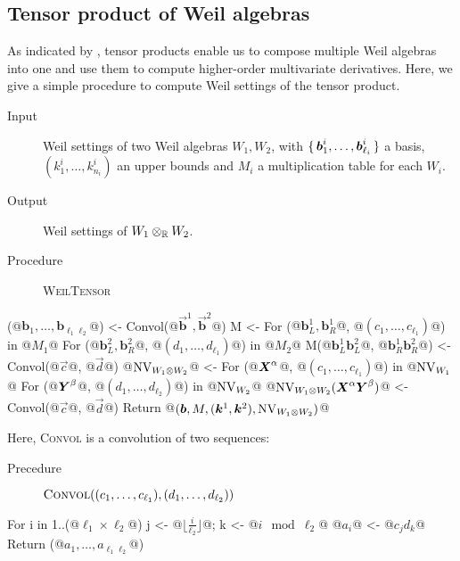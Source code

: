 \documentclass[runningheads]{llncs}
\begin{document}
\subsection{Tensor product of Weil algebras}
\label{sec:tensor-algorithm}
As indicated by , tensor products enable us to compose multiple Weil algebras into one and use them to compute higher-order multivariate derivatives.
Here, we give a simple procedure to compute Weil settings of the tensor product.

\begin{algorithm}[WeilTensor]\label{alg:weil-tensor}
\hfill\vspace{-.25em}
\begin{description}
  \item[Input] Weil settings of two Weil algebras $W_1, W_2$,
  with $\set{\boldsymbol{b}_1^i, \dots, \boldsymbol{b}_{\ell_i}^i}$ a basis,
  $(k^i_1, \dots, k^i_{n_i})$ an upper bounds and $M_i$ a multiplication table for each $W_i$.
  \item[Output] Weil settings of $W_1 \otimes_{\mathbb{R}} W_2$.
  \item[Procedure] {\upshape \textsc{WeilTensor}}
\end{description}
\begin{alg}
(@$\boldsymbol{b}_1, \dots, \boldsymbol{b}_{\ell_1 \ell_2}$@) <- Convol(@$\vec{\boldsymbol{b}}^1, \vec{\boldsymbol{b}}^2$@)
M <- {}
For ({@$\boldsymbol{b}^1_L, \boldsymbol{b}^1_R$@}, @$(c_1,\dots,c_{\ell_1})$@) in @$M_1$@
  For ({@$\boldsymbol{b}^2_L, \boldsymbol{b}^2_R$@}, @$(d_1,\dots,d_{\ell_1})$@) in @$M_2$@
    M({@$\boldsymbol{b}^1_L \boldsymbol{b}^2_L$@, @$\boldsymbol{b}^1_R \boldsymbol{b}^2_R$@}) <- Convol(@$\vec{c}$@, @$\vec{d}$@)
@$\operatorname{NV}_{W_1 \otimes W_2}$@ <- {}
For (@$\boldsymbol{X}^\alpha$@, @$(c_1, \dots, c_{\ell_1})$@) in @$\operatorname{NV}_{W_1}$@
  For (@$\boldsymbol{Y}^\beta$@, @$(d_1,\dots,d_{\ell_2})$@) in @$\operatorname{NV}_{W_2}$@
    @$\operatorname{NV}_{W_1 \otimes W_2}(\boldsymbol{X}^\alpha\boldsymbol{Y}^\beta)$@ <- Convol(@$\vec{c}$@, @$\vec{d}$@)
Return @$(\boldsymbol{b}, M, (\vec{k}^1, \vec{k}^2), \NonVan_{W_1 \otimes W_2})$@
\end{alg}

Here, {\upshape \textsc{Convol}} is a convolution of two sequences:
\begin{description}
  \item[Precedure] $\mathop{\text{\upshape\scshape Convol}}((c_1, \dots, c_{\ell_1}), (d_1, \dots, d_{\ell_2}))$
\end{description}
\begin{alg}
For i in 1..(@$\ell_1 \times \ell_2$@)
  j <- @$\lfloor \frac{i}{\ell_2} \rfloor$@; k <- @$i \mod{\ell_2}$@
  @$a_i$@ <- @$c_j d_k$@
Return (@$a_1, \dots, a_{\ell_1 \ell_2}$@)
\end{alg}
\end{algorithm}
\end{document}
